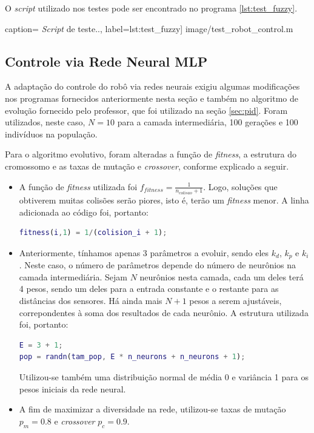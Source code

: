 	\FloatBarrier
		
	O \textit{script} utilizado nos testes pode ser encontrado no programa
	\ref{lst:test_fuzzy}.
	
	 caption={  
	\textit{Script} de teste..}, label={lst:test_fuzzy}]
	{image/test_robot_control.m}

	\subsection {Controle via Rede Neural MLP}
	
	A adaptação do controle do robô via redes neurais exigiu algumas modificações
	nos programas fornecidos anteriormente nesta seção e também no algoritmo de
	evolução fornecido pelo professor, que foi utilizado na seção \ref{sec:pid}.
	Foram utilizados, neste caso, \(N = 10\) para a camada intermediária, 100
	gerações e 100 indivíduos na população.
	
	\vspace{12pt}
	
	Para o algoritmo evolutivo, foram alteradas a função de \textit{fitness}, a
	estrutura do cromossomo e as taxas de mutação e \textit{crossover}, conforme
	explicado a seguir.
	
	\begin{itemize}
	  \item A função de \textit{fitness} utilizada foi
	  \(f_{fitness}=\frac{1}{n_{colisao} + 1}\). Logo, soluções que obtiverem
	  muitas colisões serão piores, isto é, terão um \textit{fitness} menor. A
	  linha adicionada ao código foi, portanto:
	  
\begin{lstlisting}[language=Matlab, style=nonumbers]
fitness(i,1) = 1/(colision_i + 1);
\end{lstlisting}
	
	  \item  Anteriormente, tínhamos apenas 3 parâmetros a evoluir, sendo eles
	  \(k_d\), \(k_p\) e \(k_i\). Neste caso, o número de parâmetros depende do
	  número de neurônios na camada intermediária. Sejam \(N\) neurônios nesta
	  camada, cada um deles terá 4 pesos, sendo um deles para a entrada constante e
	  o restante para as distâncias dos sensores. Há ainda mais \(N + 1\) pesos a
	  serem ajustáveis, correpondentes à soma dos resultados de cada neurônio. A
	  estrutura utilizada foi, portanto:
	  
\begin{lstlisting}[language=Matlab, style=nonumbers]
% Numero de entradas: d1, d2, d3 e termo constante
E = 3 + 1;
pop = randn(tam_pop, E * n_neurons + n_neurons + 1);
\end{lstlisting}	  
	
	  Utilizou-se também uma distribuição normal de média 0 e variância 1 para os
	  pesos iniciais da rede neural.
	  
	  \item A fim de maximizar a diversidade na rede, utilizou-se taxas de mutação
	  \(p_m = 0.8\) e \textit{crossover} \(p_c = 0.9\).

	\end{itemize}
	
